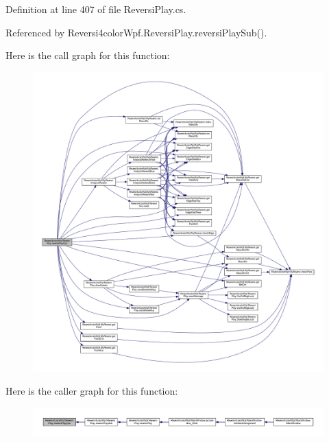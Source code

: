 Definition at line 407 of file Reversi\+Play.\+cs.



Referenced by Reversi4color\+Wpf.\+Reversi\+Play.\+reversi\+Play\+Sub().



Here is the call graph for this function\+:
\nopagebreak
\begin{figure}[H]
\begin{center}
\leavevmode
\includegraphics[width=350pt]{class_reversi4color_wpf_1_1_reversi_play_a2c7daaca43563e35abf8e65347c65a23_cgraph}
\end{center}
\end{figure}




Here is the caller graph for this function\+:
\nopagebreak
\begin{figure}[H]
\begin{center}
\leavevmode
\includegraphics[width=350pt]{class_reversi4color_wpf_1_1_reversi_play_a2c7daaca43563e35abf8e65347c65a23_icgraph}
\end{center}
\end{figure}


